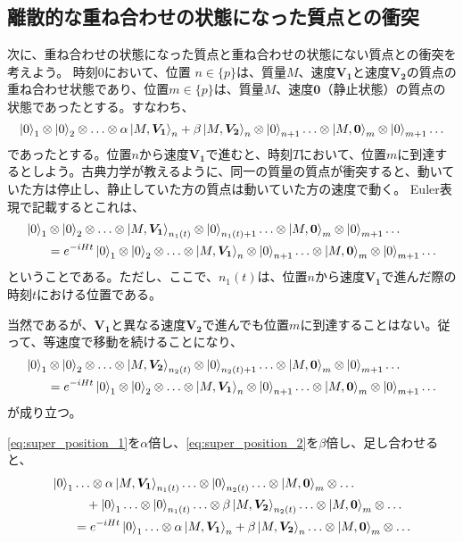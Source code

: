 \subsection{離散的な重ね合わせの状態になった質点との衝突}
次に、重ね合わせの状態になった質点と重ね合わせの状態にない質点との衝突を考えよう。
時刻$0$において、位置 $n \in \{p\}$は、質量$M$、速度$\bm{V_1}$と速度$\bm{V_2}$の質点の重ね合わせ状態であり、位置$m \in \{p\}$は、質量$M$、速度$\bm{0}$（静止状態）の質点の状態であったとする。すなわち、
\begin{equation}
    \ket{0}_1 \otimes \ket{0}_2 \otimes \ldots \otimes \alpha \ket{M,\bm{V_1}}_n + \beta \ket{M,\bm{V_2}}_n \otimes \ket{0}_{n+1} \ldots \otimes \ket{M,\bm{0}}_m \otimes \ket{0}_{m+1} \ldots
\end{equation}
であったとする。位置$n$から速度$\bm{V_1}$で進むと、時刻$T$において、位置$m$に到達するとしよう。古典力学が教えるように、同一の質量の質点が衝突すると、動いていた方は停止し、静止していた方の質点は動いていた方の速度で動く。
Euler表現で記載するとこれは、
\begin{align}
    \label{eq:super_position_1}
    \ket{0}_1 & \otimes \ket{0}_2 \otimes \ldots \otimes \ket{M,\bm{V_1}}_{n_1(t)} \otimes \ket{0}_{n_1(t)+1} \ldots \otimes \ket{M,\bm{0}}_m \otimes \ket{0}_{m+1} \ldots \\
    &=e^{-iHt}\ket{0}_1 \otimes \ket{0}_2 \otimes \ldots \otimes \ket{M,\bm{V_1}}_n \otimes \ket{0}_{n+1} \ldots \otimes \ket{M,\bm{0}}_m \otimes \ket{0}_{m+1} \ldots \nonumber
\end{align}
ということである。ただし、ここで、$n_1(t)$は、位置$n$から速度$\bm{V_1}$で進んだ際の時刻$t$における位置である。\par
当然であるが、$\bm{V_1}$と異なる速度$\bm{V_2}$で進んでも位置$m$に到達することはない。従って、等速度で移動を続けることになり、
\begin{align}
    \label{eq:super_position_2}
    \ket{0}_1 & \otimes \ket{0}_2 \otimes \ldots \otimes \ket{M,\bm{V_2}}_{n_2(t)} \otimes \ket{0}_{n_2(t)+1} \ldots \otimes \ket{M,\bm{0}}_m \otimes \ket{0}_{m+1} \ldots \\
    &=e^{-iHt}\ket{0}_1 \otimes \ket{0}_2 \otimes \ldots \otimes \ket{M,\bm{V_1}}_n \otimes \ket{0}_{n+1} \ldots \otimes \ket{M,\bm{0}}_m \otimes \ket{0}_{m+1} \ldots \nonumber
\end{align}
が成り立つ。\par
\eqref{eq:super_position_1}を$\alpha$倍し、\eqref{eq:super_position_2}を$\beta$倍し、足し合わせると、
\begin{align}
    \label{eq:super_position_12}
    \ket{0}_1 & \ldots \otimes \alpha \ket{M,\bm{V_1}}_{n_1(t)} \ldots \otimes \ket{0}_{n_2(t)}  \ldots \otimes \ket{M,\bm{0}}_m \otimes\ldots \\
    & \quad + \ket{0}_1 \ldots \otimes \ket{0}_{n_1(t)} \ldots \otimes \beta \ket{M,\bm{V_2}}_{n_2(t)}  \ldots \otimes \ket{M,\bm{0}}_m \otimes \ldots \nonumber \\
    &=e^{-iHt}\ket{0}_1 \ldots \otimes \alpha \ket{M,\bm{V_1}}_n + \beta \ket{M,\bm{V_2}}_n \ldots \otimes \ket{M,\bm{0}}_m \otimes \ldots \nonumber
\end{align}
